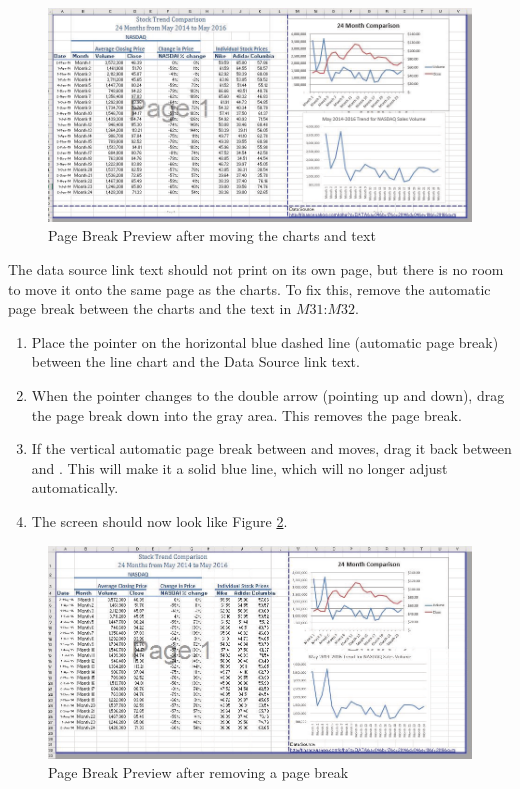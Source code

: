 \begin{figure}[H]
	\centering
	\includegraphics[width=\maxwidth{.95\linewidth}]{gfx/ch04_fig54}
	\caption{Page Break Preview after moving the charts and text}
	\label{04:fig54}
\end{figure}

The data source link text should not print on its own page, but there is no room to move it onto the same page as the charts. To fix this, remove the automatic page break between the charts and the text in $ M31 $:$ M32 $.

\begin{enumerate}
	\item Place the pointer on the horizontal blue dashed line (automatic page break) between the line chart and the Data Source link text.
	\item When the pointer changes to the double arrow (pointing up and down), drag the page break down into the gray area. This removes the page break.
	\item If the vertical automatic page break between  and  moves, drag it back between  and . This will make it a solid blue line, which will no longer adjust automatically.
	\item The screen should now look like Figure \ref{04:fig55}.
\end{enumerate}

\begin{figure}[H]
	\centering
	\includegraphics[width=\maxwidth{.95\linewidth}]{gfx/ch04_fig55}
	\caption{Page Break Preview after removing a page break}
	\label{04:fig55}
\end{figure}

